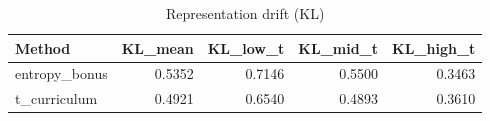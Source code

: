\begin{table}[htbp]
\centering
\caption{Representation drift (KL)}
\label{tab:repr-drift}
\begin{tabular}{lrrrr}
\toprule
\textbf{Method} & \textbf{KL\_mean} & \textbf{KL\_low\_t} & \textbf{KL\_mid\_t} & \textbf{KL\_high\_t} \\
\midrule
entropy\_bonus & 0.5352 & 0.7146 & 0.5500 & 0.3463 \\
t\_curriculum & 0.4921 & 0.6540 & 0.4893 & 0.3610 \\
\bottomrule
\end{tabular}
\end{table}